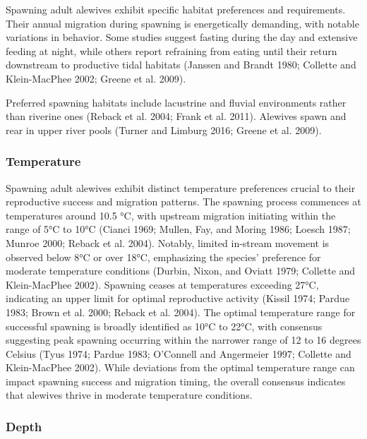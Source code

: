 \documentclass[
]{book}
\begin{document}
Spawning adult alewives exhibit specific habitat preferences and requirements. Their annual migration during spawning is energetically demanding, with notable variations in behavior. Some studies suggest fasting during the day and extensive feeding at night, while others report refraining from eating until their return downstream to productive tidal habitats (Janssen and Brandt 1980; Collette and Klein-MacPhee 2002; Greene et al. 2009).

Preferred spawning habitats include lacustrine and fluvial environments rather than riverine ones (Reback et al. 2004; Frank et al. 2011). Alewives spawn and rear in upper river pools (Turner and Limburg 2016; Greene et al. 2009).

\hypertarget{temperature}{%
\subsubsection{Temperature}\label{temperature}}

Spawning adult alewives exhibit distinct temperature preferences crucial to their reproductive success and migration patterns. The spawning process commences at temperatures around 10.5 °C, with upstream migration initiating within the range of 5°C to 10°C (Cianci 1969; Mullen, Fay, and Moring 1986; Loesch 1987; Munroe 2000; Reback et al. 2004). Notably, limited in-stream movement is observed below 8°C or over 18°C, emphasizing the species' preference for moderate temperature conditions (Durbin, Nixon, and Oviatt 1979; Collette and Klein-MacPhee 2002). Spawning ceases at temperatures exceeding 27°C, indicating an upper limit for optimal reproductive activity (Kissil 1974; Pardue 1983; Brown et al. 2000; Reback et al. 2004). The optimal temperature range for successful spawning is broadly identified as 10°C to 22°C, with consensus suggesting peak spawning occurring within the narrower range of 12 to 16 degrees Celsius (Tyus 1974; Pardue 1983; O'Connell and Angermeier 1997; Collette and Klein-MacPhee 2002). While deviations from the optimal temperature range can impact spawning success and migration timing, the overall consensus indicates that alewives thrive in moderate temperature conditions.

\hypertarget{depth}{%
\subsubsection{Depth}\label{depth}}
\end{document}
